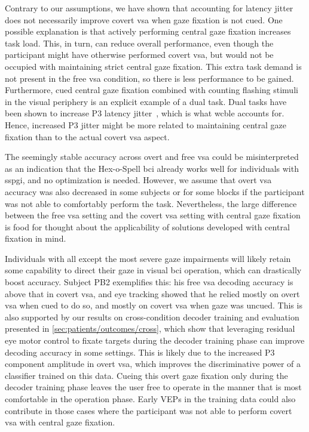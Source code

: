 \documentclass[twocolumn]{article}
\begin{document}
Contrary to our assumptions, we have shown that accounting for latency jitter does not
necessarily improve covert \ac{vsa} when gaze fixation is not cued.
One possible explanation is that actively performing central gaze fixation
increases task load.
This, in turn, can reduce overall performance, even though the participant might
have otherwise performed covert \ac{vsa}, but would not be occupied with
maintaining strict central gaze fixation.
This extra task demand is not present in the free \ac{vsa} condition, so
there is less performance to be gained.
Furthermore, cued central gaze fixation combined with counting flashing stimuli
in the visual periphery is an explicit example of a dual task.
Dual tasks have been shown to increase P3 latency
jitter~\cite{Polich2007,Arico2014, VanDenKerchove2024},
which is what \ac{wcble} accounts for.
Hence, increased P3 jitter might be more related to maintaining central gaze fixation
than to the actual covert \ac{vsa} aspect.

The seemingly stable accuracy across overt and free \ac{vsa} could be
misinterpreted as an indication that the Hex-o-Spell \ac{bci} already works
well for individuals with \ac{sspgi}, and no optimization is
needed.
However, we assume that overt \ac{vsa} accuracy was also decreased in some
subjects or for some blocks if the participant was not able to comfortably
perform the task.
Nevertheless, the large difference between the free \ac{vsa} setting and the
covert \ac{vsa} setting
with central gaze fixation is food for thought about the applicability of
solutions developed with central fixation in mind.

Individuals with all except the most severe gaze impairments will likely retain
some capability to direct their gaze in visual \ac{bci} operation, which can
drastically boost accuracy.
Subject PB2 exemplifies this: his free \ac{vsa} decoding accuracy is above that in covert
\ac{vsa}, and eye tracking showed that he relied mostly
on overt \ac{vsa} when cued to do so, and mostly on covert \ac{vsa} when
gaze was uncued.
This is also supported by our results on cross-condition decoder training and evaluation presented
in \cref{sec:patients/outcomes/cross}, which show that leveraging residual
eye motor control to fixate targets during the decoder training phase can improve
decoding accuracy in some settings.
This is likely due to the increased P3 component amplitude in overt \ac{vsa},
which improves the discriminative power of a classifier trained on this data.
Cueing this overt gaze fixation only during the decoder training phase leaves the user
free to operate in the manner that is most comfortable in the
operation phase.
Early VEPs in the training data could also contribute in those cases where the participant was not
able to perform covert \ac{vsa} with central gaze fixation.
\end{document}
